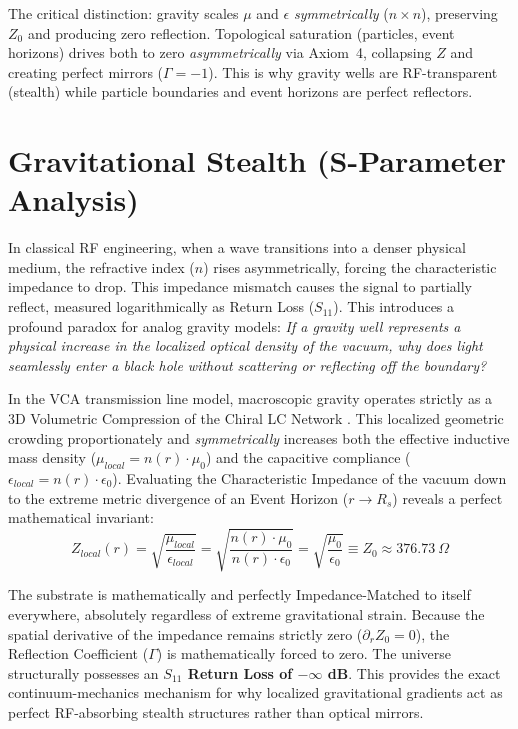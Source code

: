 \noindent The critical distinction: gravity scales $\mu$ and $\epsilon$ \textit{symmetrically} ($n \times n$), preserving $Z_0$ and producing zero reflection. Topological saturation (particles, event horizons) drives both to zero \textit{asymmetrically} via Axiom~4, collapsing $Z$ and creating perfect mirrors ($\Gamma = -1$\gammaundeclared{}). This is why gravity wells are RF-transparent (stealth) while particle boundaries and event horizons are perfect reflectors.\section{Gravitational Stealth (S-Parameter Analysis)}

In classical RF engineering, when a wave transitions into a denser physical medium, the refractive index ($n$) rises asymmetrically, forcing the characteristic impedance to drop. This impedance mismatch causes the signal to partially reflect, measured logarithmically as Return Loss ($S_{11}$). This introduces a profound paradox for analog gravity models: \textit{If a gravity well represents a physical increase in the localized optical density of the vacuum, why does light seamlessly enter a black hole without scattering or reflecting off the boundary?}

In the VCA transmission line model, macroscopic gravity operates strictly as a 3D Volumetric Compression of the Chiral LC Network \cite{misner1973}. This localized geometric crowding proportionately and \textit{symmetrically} increases both the effective inductive mass density ($\mu_{local} = n(r) \cdot \mu_0$) and the capacitive compliance ($\epsilon_{local} = n(r) \cdot \epsilon_0$). Evaluating the Characteristic Impedance of the vacuum down to the extreme metric divergence of an Event Horizon ($r \to R_s$) reveals a perfect mathematical invariant:
\begin{equation}
Z_{local}(r) = \sqrt{\frac{\mu_{local}}{\epsilon_{local}}} = \sqrt{\frac{n(r) \cdot \mu_0}{n(r) \cdot \epsilon_0}} = \sqrt{\frac{\mu_0}{\epsilon_0}} \equiv Z_0 \approx 376.73\ \Omega
\end{equation}

The substrate is mathematically and perfectly Impedance-Matched to itself everywhere, absolutely regardless of extreme gravitational strain. Because the spatial derivative of the impedance remains strictly zero ($\partial_r Z_0 = 0$), the Reflection Coefficient ($\Gamma$) is mathematically forced to zero. The universe structurally possesses an \textbf{$S_{11}$ Return Loss of $-\infty$ dB}. This provides the exact continuum-mechanics mechanism for why localized gravitational gradients act as perfect RF-absorbing stealth structures rather than optical mirrors.

